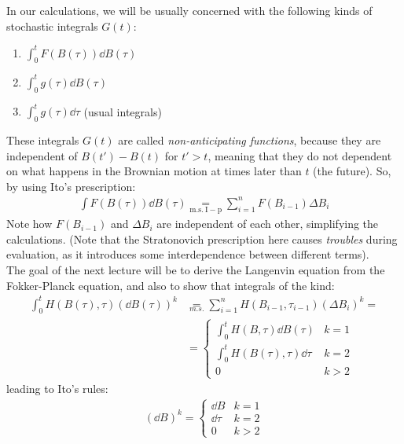 \documentclass[../template.tex]{subfiles}
\begin{document}
In our calculations, we will be usually concerned with the following kinds of stochastic integrals $G(t)$:
\begin{enumerate}
    \item $\displaystyle \int_0^t F(B(\tau)) \dd{B(\tau)}$
    \item $\displaystyle \int_0^t g(\tau) \dd{B(\tau)}$
    \item $\displaystyle \int_0^t g(\tau) \dd{\tau}$ (usual integrals)
\end{enumerate}
These integrals $G(t)$ are called \textit{non-anticipating functions}, because they are independent of $B(t') - B(t)$ for $t' > t$, meaning that they do not dependent on what happens in the Brownian motion at times later than $t$ (the future). So, by using Ito's prescription:
\begin{align*}
    \int F(B(\tau)) \dd{B(\tau)} \underset{\mathrm{m.s.\>I-p} }{=} \sum_{i=1}^n F(B_{i-1}) \Delta B_i 
\end{align*}     
Note how $F(B_{i-1})$ and $\Delta B_i$ are independent of each other, simplifying the calculations. (Note that the Stratonovich prescription here causes \textit{troubles} during evaluation, as it introduces some interdependence between different terms).\\

The goal of the next lecture will be to derive the Langenvin equation from the Fokker-Planck equation, and also to show that integrals of the kind:
\begin{align*}
    \int_0^t H(B(\tau), \tau) (\dd{B(\tau)})^k &\underset{m.s.}{=} \sum_{i=1}^n H(B_{i-1}, \tau_{i-1}) (\Delta B_i)^k =\\
    &= \begin{cases}
        \int_0^t H(B, \tau) \dd{B(\tau)} & k=1\\
        \int_0^t H(B(\tau), \tau) \dd{\tau} & k=2\\
        0 & k > 2
    \end{cases}
\end{align*}
leading to Ito's rules:
\begin{align*}
    (\dd{B})^k = \begin{cases}
        \dd{B} & k=1\\
        \dd{\tau} & k=2\\
        0 & k>2
    \end{cases}
\end{align*}
\end{document}
